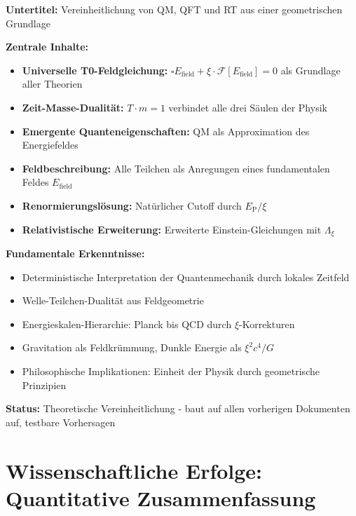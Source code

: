 \documentclass[12pt,a4paper]{article}
\newcommand{\xipar}{\xi}
\newcommand{\Efield}{E_{\text{field}}}
\newcommand{\EP}{E_{\text{P}}}
\begin{document}
	\begin{documentbox}
		\textbf{Untertitel:} Vereinheitlichung von QM, QFT und RT aus einer geometrischen Grundlage
		
		\textbf{Zentrale Inhalte:}
		\begin{itemize}
			\item \textbf{Universelle T0-Feldgleichung:} $\square \Efield + \xipar \cdot \mathcal{F}[\Efield] = 0$ als Grundlage aller Theorien
			\item \textbf{Zeit-Masse-Dualität:} $T \cdot m = 1$ verbindet alle drei Säulen der Physik
			\item \textbf{Emergente Quanteneigenschaften:} QM als Approximation des Energiefeldes
			\item \textbf{Feldbeschreibung:} Alle Teilchen als Anregungen eines fundamentalen Feldes $\Efield$
			\item \textbf{Renormierungslösung:} Natürlicher Cutoff durch $\EP/\xipar$
			\item \textbf{Relativistische Erweiterung:} Erweiterte Einstein-Gleichungen mit $\Lambda_{\xipar}$
		\end{itemize}
		
		\textbf{Fundamentale Erkenntnisse:}
		\begin{itemize}
			\item Deterministische Interpretation der Quantenmechanik durch lokales Zeitfeld
			\item Welle-Teilchen-Dualität aus Feldgeometrie
			\item Energieskalen-Hierarchie: Planck bis QCD durch $\xipar$-Korrekturen
			\item Gravitation als Feldkrümmung, Dunkle Energie als $\xipar^2 c^4 / G$
			\item Philosophische Implikationen: Einheit der Physik durch geometrische Prinzipien
		\end{itemize}
		
		\textbf{Status:} Theoretische Vereinheitlichung - baut auf allen vorherigen Dokumenten auf, testbare Vorhersagen
	\end{documentbox}
	
	\section{Wissenschaftliche Erfolge: Quantitative Zusammenfassung}
	
\end{document}
